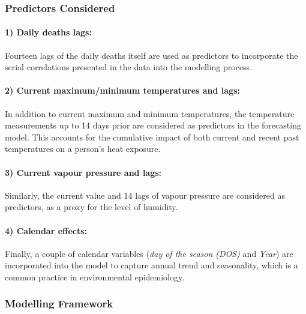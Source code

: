 \documentclass[
  11pt,
  a4paper,
]{article}
\begin{document}
\pagebreak[3]

\subsubsection{Predictors Considered}\label{predictors-considered}

\paragraph{1) Daily deaths lags:}\label{daily-deaths-lags}

Fourteen lags of the daily deaths itself are used as predictors to
incorporate the serial correlations presented in the data into the
modelling process.

\paragraph{2) Current maximum/minimum temperatures and
lags:}\label{current-maximumminimum-temperatures-and-lags}

In addition to current maximum and minimum temperatures, the temperature
measurements up to 14 days prior are considered as predictors in the
forecasting model. This accounts for the cumulative impact of both
current and recent past temperatures on a person's heat exposure.

\paragraph{3) Current vapour pressure and
lags:}\label{current-vapour-pressure-and-lags}

Similarly, the current value and 14 lags of vapour pressure are
considered as predictors, as a proxy for the level of humidity.

\paragraph{4) Calendar effects:}\label{calendar-effects}

Finally, a couple of calendar variables (\emph{day of the season (DOS)}
and \emph{Year}) are incorporated into the model to capture annual trend
and seasonality, which is a common practice in environmental
epidemiology.

\subsubsection{Modelling Framework}\label{modelling-framework}
\end{document}
